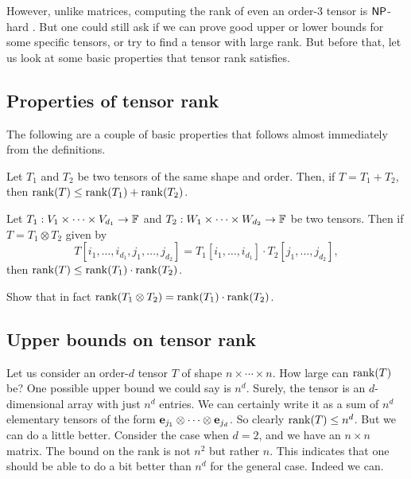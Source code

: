However, unlike matrices, computing the rank of even an order-$3$ tensor is $\mathsf{NP}$-hard \cite{h90}.
But one could still ask if we can prove good upper or lower bounds for some specific tensors, or try to find a tensor with large rank.
But before that, let us look at some basic properties that tensor rank satisfies.

\subsection*{Properties of  tensor rank}

The following are a couple of basic properties that follows almost immediately from the definitions.

\begin{lemma}\label{lem:tensor-subadditivity}
  Let $T_1$ and $T_2$ be two tensors of the same shape and order.
Then, if $T = T_1 + T_2$, then $\operatorname{rank}(T) \leq \operatorname{rank}(T_1) + \operatorname{rank}(T_2)$.
\end{lemma}

\begin{lemma}\label{lem:tensor-submultiplicativity}
  Let $T_1: V_1 \times \cdots \times V_{d_1} \rightarrow \mathbb{F}$ and $T_2: W_1 \times \cdots \times W_{d_2} \rightarrow \mathbb{F}$ be two tensors.
Then if $T = T_1 \otimes T_2$ given by
\[
T[i_1,\ldots, i_{d_1},j_1,\ldots, j_{d_2}] = T_1[i_1,\ldots, i_{d_1}] \cdot T_2[j_1,\ldots, j_{d_2}],
\]
then $\operatorname{rank}(T) \leq \operatorname{rank}(T_1) \cdot \operatorname{rank}(T_2)$. 
\end{lemma}

\begin{exercise}
  Show that in fact $\operatorname{rank}(T_1 \otimes T_2) = \operatorname{rank}(T_1) \cdot \operatorname{rank}(T_2)$.
\end{exercise}

\subsection{Upper bounds on tensor rank}

Let us consider an order-$d$ tensor $T$ of shape $n \times \cdots \times n$.
How large can $\operatorname{rank}(T)$ be?
One possible upper bound we could say is $n^d$.
Surely, the tensor is an $d$-dimensional array with just $n^d$ entries.
We can certainly write it as a sum of $n^d$ elementary tensors of the form $\mathbf{e}_{j_1} \otimes \cdots \otimes \mathbf{e}_{j_d}$.
So clearly $\operatorname{rank}(T) \leq n^d$.
But we can do a little better.
Consider the case when $d=2$, and we have an $n\times n$ matrix.
The bound on the rank is not $n^2$ but rather $n$.
This indicates that one should be able to do a bit better than $n^d$ for the general case.
Indeed we can.


